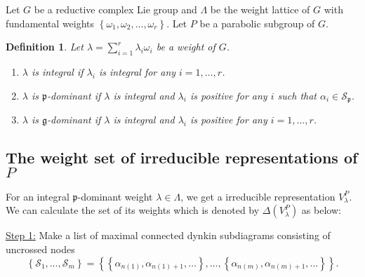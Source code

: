 \documentclass[uplatex,dvipdfmx]{jsarticle}
\newtheorem{definition}{Definition}[section]
\begin{document}
Let
$G$
be a reductive complex Lie group and
$\Lambda$
be the weight lattice of
$G$
with fundamental weights
$\left\{ \omega_1, \omega_2, \ldots, \omega_r \right\}$.
Let
$P$
be a parabolic subgroup of
$G$.

\begin{definition}
    Let 
    $\lambda = \sum_{i = 1}^r \lambda_i \omega_i$ 
    be a weight of
    $G$.
    \begin{enumerate}
        \item
            $\lambda$
            is
            \textit{integral} 
            if
            $\lambda_i$
            is integral for any
            $i = 1, \ldots, r$.
        \item 
            $\lambda$
            is
            $\mathfrak{p}$\textit{-dominant} 
            if
            $\lambda$
            is integral and
            $\lambda_i$
            is positive for any
            $i$
            such that
            $\alpha_i \in \mathcal{S}_\mathfrak{p}$.
        \item 
            $\lambda$
            is
            $\mathfrak{g}$\textit{-dominant} 
            if
            $\lambda$
            is integral and
            $\lambda_i$
            is positive for any
            $i = 1, \ldots, r$.
    \end{enumerate}
\end{definition}

\subsection{The weight set of irreducible representations of $P$}

For an integral
$\mathfrak{p}$-dominant
weight
$\lambda \in \Lambda$,
we get a irreducible representation
$V_\lambda^P$.
We can calculate the set of its weights which is denoted by
$\Delta(V_\lambda^P)$ as below:

\underline{Step 1:}
Make a list of maximal connected dynkin subdiagrams consisting of uncrossed nodes
\begin{equation}
    \left\{ 
        \mathcal{S}_1, 
        \ldots, 
        \mathcal{S}_m 
    \right\}
    =
    \left\{
        \left\{ \alpha_{n(1)}, \alpha_{n(1)+1}, \ldots \right\},
        \ldots, 
        \left\{ \alpha_{n(m)}, \alpha_{n(m)+1}, \ldots \right\} 
    \right\}.
\end{equation}
\end{document}
